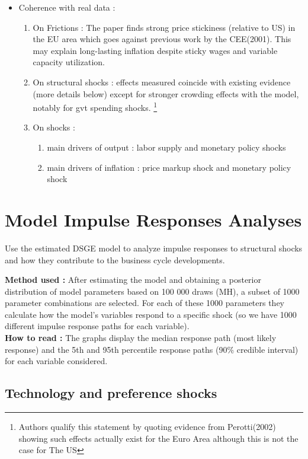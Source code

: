 \documentclass{article}
\begin{document}
\begin{itemize}
    \item Coherence with real data : 
    \begin{enumerate}
        \item On Frictions : The paper finds strong price stickiness (relative to US) in the EU area which goes against previous work by the CEE(2001). This may explain long-lasting inflation despite sticky wages and variable capacity utilization.
        \item On structural shocks : effects measured coincide with existing evidence (more details below) except for stronger crowding effects with the model, notably for gvt spending shocks. \footnote{Authors qualify this statement by quoting evidence from Perotti(2002) showing such effects actually exist for the Euro Area although this is not the case for The US}
    \item On shocks : 
    \begin{enumerate}
        \item main drivers of output : labor supply and monetary policy shocks
        \item main drivers of inflation : price markup shock and monetary policy shock
    \end{enumerate}
\end{enumerate}
\end{itemize}


\section{Model Impulse Responses Analyses}
Use the estimated DSGE model to analyze impulse responses to structural shocks and how they contribute to the business cycle developments. 
\begin{detailbox}
    \textbf{Method used :} After estimating the model and obtaining a posterior distribution of model parameters based on 100 000 draws (MH), a subset of 1000 parameter combinations are selected. For each of these 1000 parameters they calculate how the model's variables respond to a specific shock (so we have 1000 different impulse response paths for each variable). \\
    \textbf{How to read :} The graphs display the median response path (most likely response) and the 5th and 95th percentile response paths (90\% credible interval) for each variable considered. 
\end{detailbox}

\subsection{Technology and preference shocks}
\end{document}
